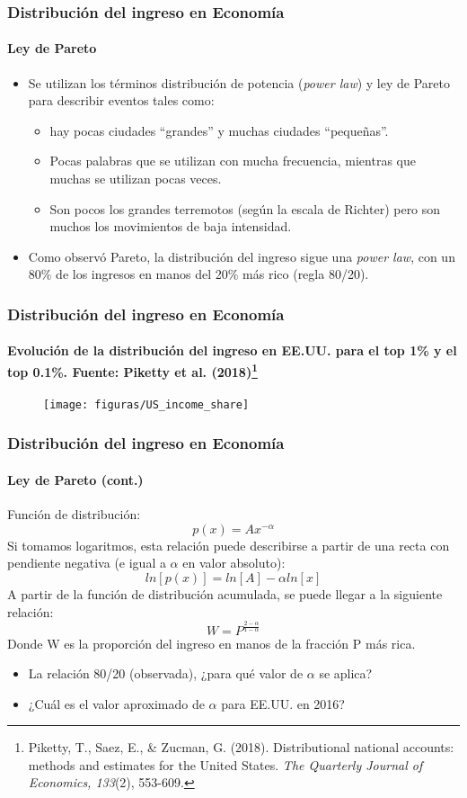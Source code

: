 \documentclass[11pt]{beamer}
\begin{document}
\begin{frame}
\frametitle{Distribución del ingreso en Economía}
\framesubtitle{Ley de Pareto}
\begin{itemize}
	\item Se utilizan los términos distribución de potencia (\textit{power law}) y ley de Pareto para describir eventos tales como:
	\begin{itemize}
		\item hay pocas ciudades ``grandes'' y muchas ciudades ``pequeñas''.
		\item Pocas palabras que se utilizan con mucha frecuencia, mientras que muchas se utilizan pocas veces.
		\item Son pocos los grandes terremotos (según la escala de Richter) pero son muchos los movimientos de baja intensidad.
	\end{itemize}
	\item Como observó Pareto, la distribución del ingreso sigue una \textit{power law}, con un 80\% de los ingresos en manos del 20\% más rico (regla 80/20).
\end{itemize}
\end{frame}

\begin{frame}
\frametitle{Distribución del ingreso en Economía}
\framesubtitle{Evolución de la distribución del ingreso en EE.UU. para el top 1\% y el top 0.1\%. Fuente: Piketty et al. (2018)\footnote{\scriptsize{Piketty, T., Saez, E., \& Zucman, G. (2018). Distributional national accounts: methods and estimates for the United States. \textit{The Quarterly Journal of Economics, 133}(2), 553-609.}}}

\begin{figure}
	\centering
	\texttt{[image: figuras/US\_income\_share]}
\label{fig:usincomeshare}
\end{figure}

\end{frame}

\begin{frame}
\frametitle{Distribución del ingreso en Economía}
\framesubtitle{Ley de Pareto (cont.)}
Función de distribución:
\begin{equation*}
p(x)=Ax^{-\alpha}
\end{equation*}
Si tomamos logaritmos, esta relación puede describirse a partir de una recta con pendiente negativa (e igual a $\alpha$ en valor absoluto):
\begin{equation*}
ln[p(x)]=ln[A] -\alpha ln[x]
\end{equation*}
A partir de la función de distribución acumulada, se puede llegar a la siguiente relación:
\begin{equation*}
W=P^{\frac{2-\alpha}{1-\alpha}}
\end{equation*}
Donde W es la proporción del ingreso en manos de la fracción P más rica.
\begin{itemize}
	\item La relación 80/20 (observada), ¿para qué valor de $\alpha$ se aplica?
	\item ¿Cuál es el valor aproximado de $\alpha$ para EE.UU. en 2016? 
\end{itemize}
\end{frame}
\end{document}
